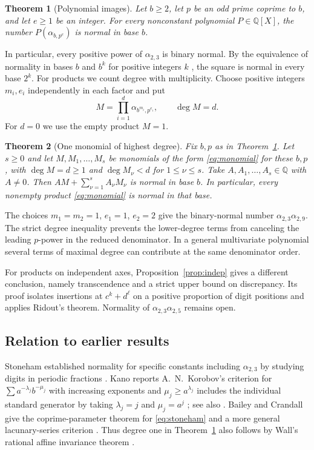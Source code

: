 \documentclass[11pt]{article}
\newtheorem{theorem}{Theorem}
\newcommand{\Q}{\mathbb Q}
\begin{document}
\begin{theorem}[Polynomial images]\label{thm:main}
Let $b\ge2$, let $p$ be an odd prime coprime to $b$, and let $e\ge1$ be an integer.
For every nonconstant polynomial $P\in\Q[X]$, the number $P(\alpha_{b,p^e})$ is normal in base $b$.
\end{theorem}

In particular, every positive power of $\alpha_{2,3}$ is binary normal. By the equivalence of normality in bases $b$ and $b^k$ for positive integers $k$ \cite{wall,bc}, the square is normal in every base $2^k$.
For products we count degree with multiplicity. Choose positive integers $m_i,e_i$
independently in each factor and put
\begin{equation}\label{eq:monomial}
 M=\prod_{i=1}^d \alpha_{b^{m_i},p^{e_i}},\qquad \deg M=d.
\end{equation}
For $d=0$ we use the empty product $M=1$.

\begin{theorem}[One monomial of highest degree]\label{thm:monomial}
Fix $b,p$ as in Theorem~\ref{thm:main}. Let $s\ge0$ and let $M,M_1,\ldots,M_s$
be monomials of the form \eqref{eq:monomial} for these $b,p$, with $\deg M=d\ge1$
and $\deg M_\nu<d$ for $1\le\nu\le s$. Take $A,A_1,\ldots,A_s\in\Q$ with $A\ne0$.
Then $AM+\sum_{\nu=1}^s A_\nu M_\nu$ is normal in base $b$.
In particular, every nonempty product \eqref{eq:monomial} is normal in that base.
\end{theorem}

The choices $m_1=m_2=1$, $e_1=1$, $e_2=2$ give the binary-normal number
$\alpha_{2,3}\alpha_{2,9}$. The strict degree inequality prevents the lower-degree terms from canceling the leading
$p$-power in the reduced denominator. In a general multivariate
polynomial several terms of maximal degree can contribute at the same denominator order.

For products on independent axes, Proposition~\ref{prop:indep} gives a different conclusion, namely transcendence and a strict upper bound on discrepancy. Its proof isolates insertions at $c^k+d^\ell$ on a positive proportion of digit positions and applies Ridout's theorem. Normality of $\alpha_{2,3}\alpha_{2,5}$ remains open.

\subsection*{Relation to earlier results}
Stoneham established normality for specific constants including $\alpha_{2,3}$ by studying
digits in periodic fractions \cite{stoneham}. Kano reports A.~N.~Korobov's criterion for
$\sum a^{-\lambda_j}b^{-\mu_j}$ with increasing exponents and $\mu_j\ge a^{\lambda_j}$
includes the individual standard generator by taking $\lambda_j=j$ and $\mu_j=a^j$
\cite[pp.~909--910]{kano}; see also \cite{korobov}. Bailey and Crandall give the coprime-parameter theorem for
\eqref{eq:stoneham} and a more general lacunary-series criterion
\cite[Theorem 4.8 and Corollary 4.9]{bc}. Thus degree one in Theorem~\ref{thm:main}
also follows by Wall's rational affine invariance theorem \cite{wall}.
\end{document}
